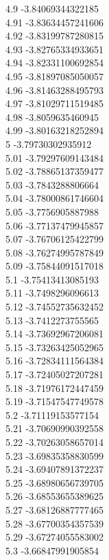 {4.9	-3.84069344322185\\
4.91	-3.83634457241606\\
4.92	-3.83199787280815\\
4.93	-3.82765334933651\\
4.94	-3.82331100692854\\
4.95	-3.81897085050057\\
4.96	-3.81463288495793\\
4.97	-3.81029711519485\\
4.98	-3.8059635460945\\
4.99	-3.80163218252894\\
5	-3.79730302935912\\
5.01	-3.79297609143484\\
5.02	-3.78865137359477\\
5.03	-3.7843288806664\\
5.04	-3.78000861746604\\
5.05	-3.7756905887988\\
5.06	-3.77137479945857\\
5.07	-3.76706125422799\\
5.08	-3.76274995787849\\
5.09	-3.75844091517018\\
5.1	-3.75413413085193\\
5.11	-3.7498296096613\\
5.12	-3.74552735632452\\
5.13	-3.7412273755565\\
5.14	-3.73692967206081\\
5.15	-3.73263425052965\\
5.16	-3.72834111564384\\
5.17	-3.72405027207281\\
5.18	-3.71976172447459\\
5.19	-3.71547547749578\\
5.2	-3.71119153577154\\
5.21	-3.70690990392558\\
5.22	-3.70263058657014\\
5.23	-3.69835358830599\\
5.24	-3.69407891372237\\
5.25	-3.68980656739705\\
5.26	-3.68553655389625\\
5.27	-3.68126887777465\\
5.28	-3.67700354357539\\
5.29	-3.67274055583002\\
5.3	-3.66847991905854\\
}
